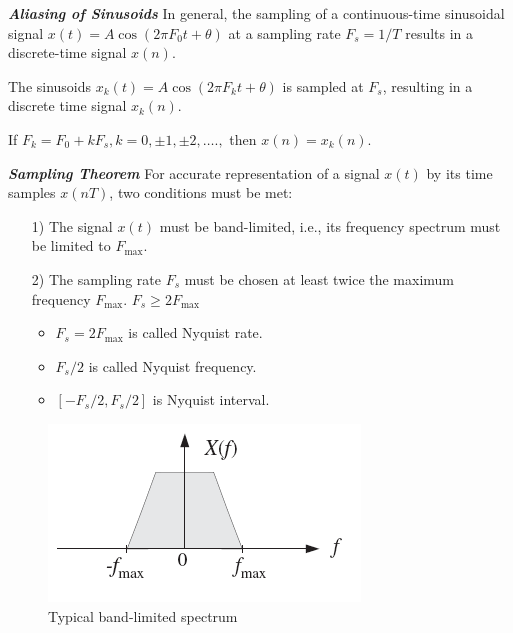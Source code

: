 \documentclass[11pt, a4paper]{article}
\begin{document}
\textit{\textbf{Aliasing of Sinusoids}} In general, the sampling of a continuous-time sinusoidal signal $x(t) = A\cos(2\pi F_0 t + \theta)$ at a sampling rate $ F_s=1/T $ results in a discrete-time signal $x(n)$.

The sinusoids $x_k(t) = A\cos(2\pi F_k t + \theta)$ is sampled at $F_s$, resulting  in a discrete time signal $x_k(n)$.

If $F_k=F_0+kF_s, k=0, \pm 1, \pm 2, ….,$ then $x(n)=x_k(n)$.

\textit{\textbf{Sampling Theorem}} For accurate representation of a signal $x(t)$ by its time samples $x(nT)$, two conditions must be met:
\begin{itemize}
    \item[1)] The signal $x(t)$ must be band-limited, i.e., its frequency spectrum must be limited to $F_{\max}$.
    \item[2)] The sampling rate $F_s$ must be chosen at least twice the maximum frequency $F_{\max}$. $F_s \geq 2F_{\max}$
    \begin{itemize}
        \item $F_s=2F_{\max}$ is called Nyquist rate.
        \item $F_s/2$ is called Nyquist frequency.
        \item $[-F_s/2, F_s/2]$ is Nyquist interval.
    \end{itemize}
\end{itemize}
\begin{figure}[h!]
    \centering
    \includegraphics[width=0.3\linewidth]{img/7.png}
    \caption{Typical band-limited spectrum}
\end{figure}
\end{document}
